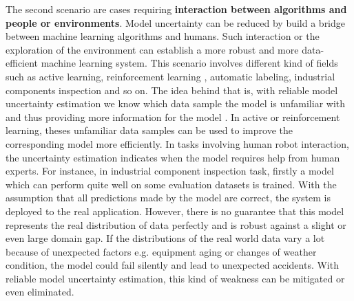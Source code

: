 The second scenario are cases requiring \textbf{interaction between algorithms and people or environments}. Model uncertainty can be reduced by build a bridge between machine learning algorithms and humans. Such interaction or the exploration of the environment can establish a more robust and more data-efficient machine learning system. This scenario involves different kind of fields such as active learning\cite{gal2017deep}, reinforcement learning\cite{blundell2015weight}\cite{osband2016deep}\cite{gal2016improving} %
, automatic labeling, industrial components inspection 
and so on. The idea behind that is, with reliable model uncertainty estimation we know which data sample the model is unfamiliar with and thus providing more information for the model 
. In active or reinforcement learning, theses unfamiliar data samples can be used to improve the corresponding model more efficiently. In tasks involving human robot interaction, the uncertainty estimation indicates when the model requires help from human experts. For instance, in industrial component inspection task, firstly a model which can perform quite well on some evaluation datasets is trained. With the assumption that all predictions made by the model are correct, the system is deployed to the real application.
However, there is no guarantee that this model represents the real distribution of data perfectly and is robust against a slight or even large domain gap. If the distributions of the real world data vary a lot because of unexpected factors e.g. equipment aging or changes of weather condition, the model could fail silently and lead to unexpected accidents. With reliable model uncertainty estimation, this kind of weakness can be mitigated or even eliminated. 

